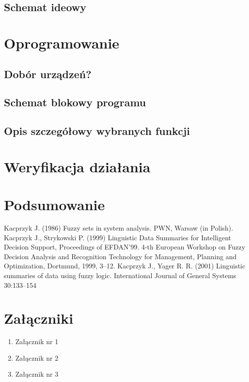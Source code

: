 \documentclass[12pt]{report}
\begin{document}
\section{Schemat ideowy}

\chapter{Oprogramowanie}

\section{Dobór urządzeń?}
\section{Schemat blokowy programu}
\section{Opis szczegółowy wybranych funkcji}
\chapter{Weryfikacja działania}
\chapter{Podsumowanie}
\begin{thebibliography}{99}
Kacprzyk J. (1986) Fuzzy sets in system analysis.  PWN, Warsaw (in Polish).
Kacprzyk J., Strykowski P. (1999) Linguistic Data Summaries for Intelligent Decision Support, Proceedings of EFDAN'99. 4-th European Workshop on Fuzzy Decision Analysis and Recognition Technology for Management, Planning and Optimization, Dortmund, 1999, 3--12.
Kacprzyk J., Yager R. R. (2001) Linguistic summaries of data using fuzzy logic. International Journal of General Systems 30:133--154 

\end{thebibliography}

\listoffigures

\listoftables


\chapter*{Załączniki}
\begin{enumerate}
\item Załącznik nr 1
\item Załącznik nr 2
\item Załącznik nr 3
\end{enumerate}
\end{document}
